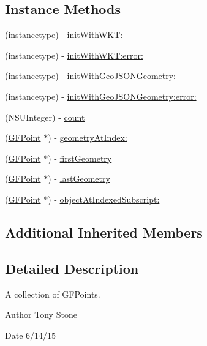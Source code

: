 \subsection*{Instance Methods}
\begin{DoxyCompactItemize}
\item 
(instancetype) -\/ \hyperlink{interface_g_f_multi_point_a003eb1cee88057991c210dd0cd63ef7f}{init\+With\+W\+K\+T\+:}
\item 
(instancetype) -\/ \hyperlink{interface_g_f_multi_point_a3da732dd6a2635ab6ac56abf24168829}{init\+With\+W\+K\+T\+:error\+:}
\item 
(instancetype) -\/ \hyperlink{interface_g_f_multi_point_a08bc62987b4e8c0435b00367dd617e00}{init\+With\+Geo\+J\+S\+O\+N\+Geometry\+:}
\item 
(instancetype) -\/ \hyperlink{interface_g_f_multi_point_aed5c1b63f03328cb0796d3be78f790b1}{init\+With\+Geo\+J\+S\+O\+N\+Geometry\+:error\+:}
\item 
(N\+S\+U\+Integer) -\/ \hyperlink{interface_g_f_multi_point_afb692f3668a3631fbec6739c7fd7bf2c}{count}
\item 
(\hyperlink{interface_g_f_point}{G\+F\+Point} $\ast$) -\/ \hyperlink{interface_g_f_multi_point_a679f88a16cfc5e7d2d2bd1fda95303be}{geometry\+At\+Index\+:}
\item 
(\hyperlink{interface_g_f_point}{G\+F\+Point} $\ast$) -\/ \hyperlink{interface_g_f_multi_point_a2f300bc57f0010bc65da0f151b916e33}{first\+Geometry}
\item 
(\hyperlink{interface_g_f_point}{G\+F\+Point} $\ast$) -\/ \hyperlink{interface_g_f_multi_point_aa0c216ccbac49420bb8694fdb3311c6b}{last\+Geometry}
\item 
(\hyperlink{interface_g_f_point}{G\+F\+Point} $\ast$) -\/ \hyperlink{interface_g_f_multi_point_a003241a11b6d6da14364bb8a07c05a35}{object\+At\+Indexed\+Subscript\+:}
\end{DoxyCompactItemize}
\subsection*{Additional Inherited Members}


\subsection{Detailed Description}
A collection of G\+F\+Points. 

\begin{DoxyAuthor}{Author}
Tony Stone 
\end{DoxyAuthor}
\begin{DoxyDate}{Date}
6/14/15 
\end{DoxyDate}


